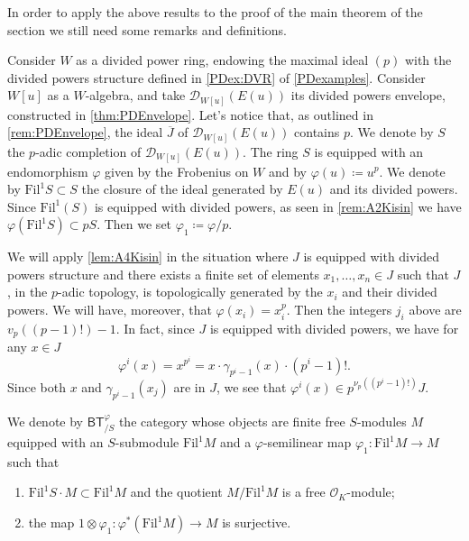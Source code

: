 \noindent
In order to apply the above results to the proof of the main theorem of the section
we still need some remarks and definitions.


\begin{ntt}[]
	Consider $W$ as a divided power ring, endowing the maximal ideal $(p)$
	with the divided powers structure defined in \cref{PDex:DVR} of \cref{PDexamples}.
	Consider $W[u]$ as a $W$-algebra, and take $\mathcal{D}_{W[u]}(E(u))$
	its divided powers envelope, constructed in \cref{thm:PDEnvelope}.
	Let's notice that, as outlined in \cref{rem:PDEnvelope},
	the ideal $\overline{J}$ of $\mathcal{D}_{W[u]}(E(u))$ contains $p$.
	We denote by $S$ the $p$-adic completion of $\mathcal{D}_{W[u]}(E(u))$.
	The ring $S$ is equipped with an endomorphism $\varphi$ given by the Frobenius
	on $W$ and by $\varphi(u) \coloneqq u^p$.
	We denote by $\mathrm{Fil}^1 S \subset S$ the closure of the ideal
	generated by $E(u)$ and its divided powers.
	Since $\mathrm{Fil}^1(S)$ is equipped with divided powers, 
	as seen in \cref{rem:A2Kisin} we have $\varphi( \mathrm{Fil}^1 S) \subset p S$.
	Then we set $\varphi_1 \coloneqq \varphi/p$.
\end{ntt}


\begin{rem}[]\label{rem:j_iTheoremA6}
	We will apply \cref{lem:A4Kisin} in the situation where $J$ is equipped
	with divided powers structure and there exists a finite set of 
	elements $x_1, \ldots, x_n \in J$ such that $J$, in the $p$-adic topology, 
	is topologically generated by the $x_i$ and their divided powers.
	We will have, moreover, that $\varphi(x_i) = x_i^p$.
	Then the integers $j_i$ above are $v_p \left( (p-1)! \right) - 1$.
	In fact, since $J$ is equipped with divided powers, we have for any $x \in J$
	\begin{equation*}
		\varphi^i(x) =
		x^{p^i} =
		x \cdot \gamma_{p^i-1}(x) \cdot (p^i-1)!
	.\end{equation*}
	Since both $x$ and $\gamma_{p^i-1}(x_j)$ are in $J$,
	we see that $\varphi^i(x) \in p^{\nu_p((p^i-1)!)}J$.
\end{rem}


\begin{defn}[]
	We denote by $\mathsf{BT}^{\varphi}_{/S}$ the category
	whose objects are finite free $S$-modules $M$
	equipped with an $S$-submodule $\mathrm{Fil}^1 M$
	and a $\varphi$-semilinear map $\varphi_1\colon  \mathrm{Fil}^1 M \to M$
	such that
\begin{enumerate}
	\item $\mathrm{Fil}^1 S \cdot M \subset \mathrm{Fil}^1 M$
		and the quotient $M/\mathrm{Fil}^1 M$ is a free $\mathcal{O}_{ K }$-module;
	\item the map $1 \otimes \varphi_1\colon 
		\varphi^* \left( \mathrm{Fil}^1 M \right) \to M$
		is surjective.
\end{enumerate}
\end{defn}


